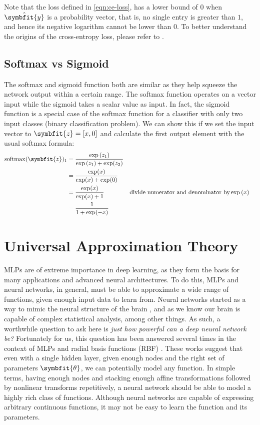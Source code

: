Note that the loss defined in \cref{eqn:ce-loss}, has a lower bound of $0$ when $\hat{\symbfit{y}}$ is a probability vector, that is, no single entry is greater than $1$, and hence its negative logarithm cannot be lower than $0$. To better understand the origins of the cross-entropy loss, please refer to \textcite{zhang2021dive}.

\subsection{Softmax vs Sigmoid}\label{ssec:softmax-vs-sigmoid}
The softmax and sigmoid function both are similar as they help squeeze the network output within a certain range. The softmax function operates on a vector input while the sigmoid takes a scalar value as input. In fact, the sigmoid function is a special case of the softmax function for a classifier with only two input classes (binary classification problem). We can show this if we set the input vector to $\symbfit{z} = [x, 0]$ and calculate the first output element with the usual softmax formula:
\begin{align*}
    \operatorname{softmax}(\symbfit{z})_{1}&=\frac{\exp{(z_{1})}}{\exp{(z_{1})}+\exp(z_{2})} \\
    &= \frac{\exp(x)}{\exp(x)+\exp(0)} \\
    &= \frac{\exp(x)}{\exp(x)+1} && \text{divide numerator and denominator by} \exp{(x)}\\
    &= \frac{1}{1 + \exp(-x)}
\end{align*}


\section{Universal Approximation Theory}\label{sec:uat}

MLPs are of extreme importance in deep learning, as they form the basis for many applications and advanced neural architectures. To do this, MLPs and neural networks, in general, must be able to approximate a wide range of functions, given enough input data to learn from. Neural networks started as a way to mimic the neural structure of the brain \parencite{mcculloch1943logical}, and as we know our brain is capable of complex statistical analysis, among other things. As such, a worthwhile question to ask here is \textit{just how powerful can a deep neural network be?}
Fortunately for us, this question has been answered several times in the context of MLPs and radial basis functions (RBF) \parencite{Cybenko1989, Micchelli1986, Hornik1991}. These works suggest that even with a single hidden layer, given enough nodes and the right set of parameters $\symbfit{\theta}$, we can potentially model any function. 
In simple terms, having enough nodes and stacking enough affine transformations followed by nonlinear transforms repetitively, a neural network should be able to model a highly rich class of functions.
Although neural networks are capable of expressing arbitrary continuous functions, it may not be easy to learn the function and its parameters.

